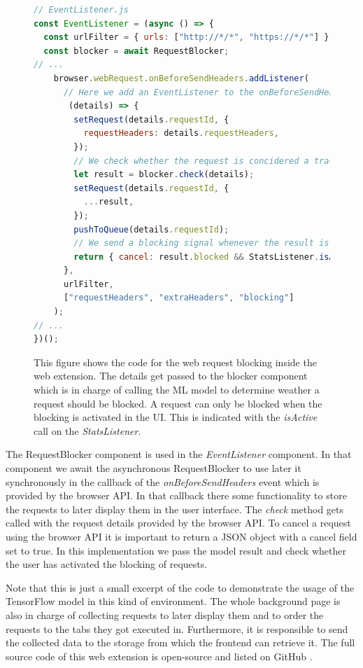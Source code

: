\begin{figure}[ht!]
\begin{lstlisting}[language=JavaScript]
// EventListener.js
const EventListener = (async () => {
  const urlFilter = { urls: ["http://*/*", "https://*/*"] };
  const blocker = await RequestBlocker;
// ...
    browser.webRequest.onBeforeSendHeaders.addListener(
      // Here we add an EventListener to the onBeforeSendHeaders event.
       (details) => {
        setRequest(details.requestId, {
          requestHeaders: details.requestHeaders,
        });
        // We check whether the request is concidered a tracking request by passing all available information into the blocker component
        let result = blocker.check(details);
        setRequest(details.requestId, {
          ...result,
        });
        pushToQueue(details.requestId);
        // We send a blocking signal whenever the result is true and the blocking setting is active
        return { cancel: result.blocked && StatsListener.isActive() };
      },
      urlFilter,
      ["requestHeaders", "extraHeaders", "blocking"]
    );
// ...
})();
\end{lstlisting}
\caption{This figure shows the code for the web request blocking inside the web extension. The details get passed to the blocker component 
  which is in charge of calling the ML model to determine weather a request should be blocked. A request can only be blocked when the blocking is
  activated in the UI. This is indicated with the \emph{isActive} call on the \emph{StatsListener}.
}
\end{figure}

The RequestBlocker component is used in the \emph{EventListener} component. In that component we await the asynchronous RequestBlocker to 
use later it synchronously in the callback of the \emph{onBeforeSendHeaders} event which is provided by the browser API. In that callback there 
some functionality to store the requests to later display them in the user interface. The \emph{check} method gets called with the request details
provided by the browser API. To cancel a request using the browser API it is important to return a JSON object with a cancel field set
to true. In this implementation we pass the model result and check whether the user has activated the blocking of requests.

Note that this is just a small excerpt of the code to demonstrate the usage of the TensorFlow model in this kind of environment. The whole background page
is also in charge of collecting requests to later display them and to order the requests to the tabs they got executed in. Furthermore, it is 
responsible to send the collected data to the storage from which the frontend can retrieve it. The full source code of this web extension is open-source
and listed on GitHub \cite{trackingDetector}.
